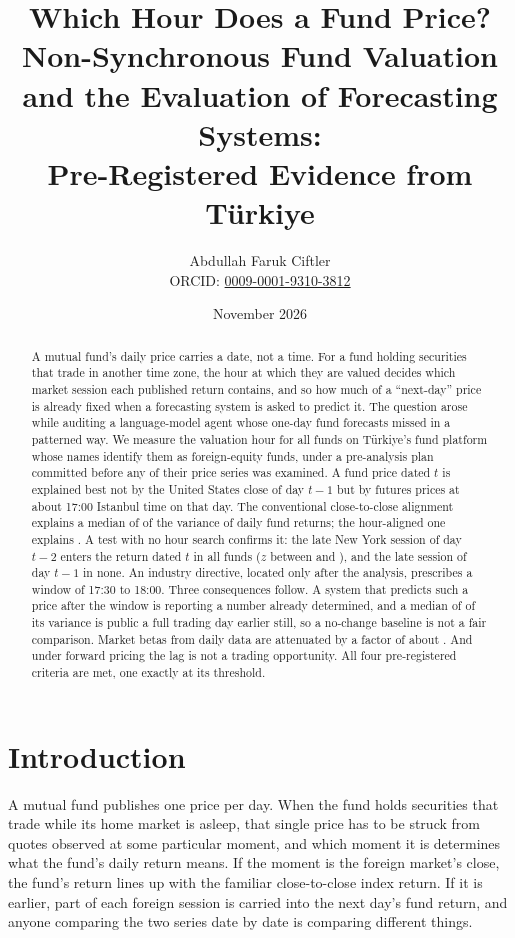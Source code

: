 \documentclass[11pt,a4paper]{article}
\title{Which Hour Does a Fund Price?\\
Non-Synchronous Fund Valuation and the Evaluation of Forecasting Systems:\\
Pre-Registered Evidence from T\"urkiye}
\author{Abdullah Faruk Ciftler\\
\small ORCID: \href{https://orcid.org/0009-0001-9310-3812}{0009-0001-9310-3812}}
\date{November 2026}
\begin{document}
\maketitle

\begin{abstract}
A mutual fund's daily price carries a date, not a time. For a fund holding
securities that trade in another time zone, the hour at which they are valued
decides which market session each published return contains, and so how much
of a ``next-day'' price is already fixed when a forecasting system is asked to
predict it. The question arose while auditing a language-model agent whose
one-day fund forecasts missed in a patterned way. We measure the valuation
hour for all \NFunds{} funds on T\"urkiye's fund platform whose names identify
them as foreign-equity funds, under a pre-analysis plan committed before any
of their price series was examined. A fund price dated $t$ is explained best
not by the United States close of day $t-1$ but by futures prices at about
17:00 Istanbul time on that day. The conventional close-to-close alignment
explains a median of \MedRefR{} of the variance of daily fund returns; the
hour-aligned one explains \MedBestR. A test with no hour search confirms it:
the late New York session of day $t-2$ enters the return dated $t$ in all
\NFunds{} funds ($z$ between \MinZL{} and \MaxZL), and the late session of day
$t-1$ in none. An industry directive, located only after the analysis,
prescribes a window of 17:30 to 18:00. Three consequences follow. A system
that predicts such a price after the window is reporting a number already
determined, and a median of \MedRLate{} of its variance is public a full
trading day earlier still, so a no-change baseline is not a fair comparison.
Market betas from daily data are attenuated by a factor of about \BetaRatio.
And under forward pricing the lag is not a trading opportunity. All four
pre-registered criteria are met, one exactly at its threshold.
\end{abstract}

\section{Introduction}

A mutual fund publishes one price per day. When the fund holds securities that
trade while its home market is asleep, that single price has to be struck from
quotes observed at some particular moment, and which moment it is determines
what the fund's daily return means. If the moment is the foreign market's
close, the fund's return lines up with the familiar close-to-close index
return. If it is earlier, part of each foreign session is carried into the
next day's fund return, and anyone comparing the two series date by date is
comparing different things.
\end{document}
